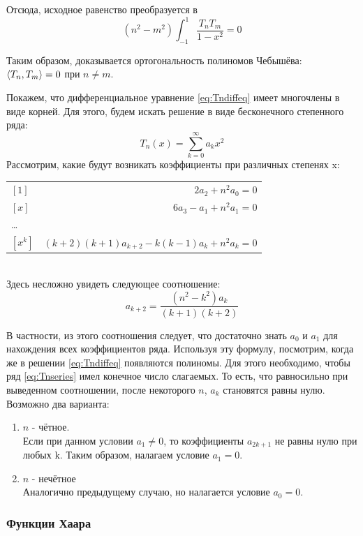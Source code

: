 \documentclass[12pt]{article}
\begin{document}
			Отсюда, исходное равенство преобразуется в
			$$(n^2 - m^2) \int_{-1}^{1} \frac{T_n T_m}{1-x^2} = 0$$
	
			Таким образом, доказывается ортогональность полиномов Чебышёва: $\left\langle T_n, T_m \right\rangle = 0$ при $n \neq m$.
	
			Покажем, что дифференциальное уравнение \eqref{eq:Tndiffeq} имеет многочлены в виде корней. Для этого, будем искать
			решение в виде бесконечного степенного ряда: 
			\begin{equation} \label{eq:Tnseries}
				T_n(x) = \sum_{k=0}^{\infty} a_k x^2
			\end{equation}
			Рассмотрим, какие будут возникать коэффициенты при различных степенях x: \\
			\begin{tabular}{l r}
				$[1]$ & $ 2a_2 + n^2 a_0 = 0 $ \\
				$[x]$ & $ 6a_3 - a_1 + n^2a_1 = 0 $ \\
				\dots \\
				$[x^k]$ & $ (k+2)(k+1) a_{k+2} - k(k-1) a_k + n^2 a_k = 0 $
			\end{tabular} \\
			Здесь несложно увидеть следующее соотношение:
			$$ a_{k+2} = \frac{(n^2 - k^2) a_k}{(k+1)(k+2)}$$
	
			В частности, из этого соотношения следует, что достаточно знать $a_0$ и $a_1$ для нахождения всех коэффициентов ряда.
			Используя эту формулу, посмотрим, когда же в решении \eqref{eq:Tndiffeq} появляются полиномы. Для этого необходимо, 
			чтобы ряд \eqref{eq:Tnseries} имел конечное число слагаемых. То есть, что равносильно при выведенном соотношении, 
			после некоторого $n$, $a_k$ становятся равны нулю. Возможно два варианта:
			\begin{enumerate}
				\item $n$ - чётное. \\
				Если при данном условии $a_1 \neq 0$, то коэффициенты $a_{2k+1}$ не равны нулю при любых k. Таким образом, налагаем
				условие $a_1 = 0$.
				\item $n$ - нечётное \\
				Аналогично предыдущему случаю, но налагается условие $a_0 = 0$.
			\end{enumerate}
	
		\subsubsection{Функции Хаара}
	
\end{document}
